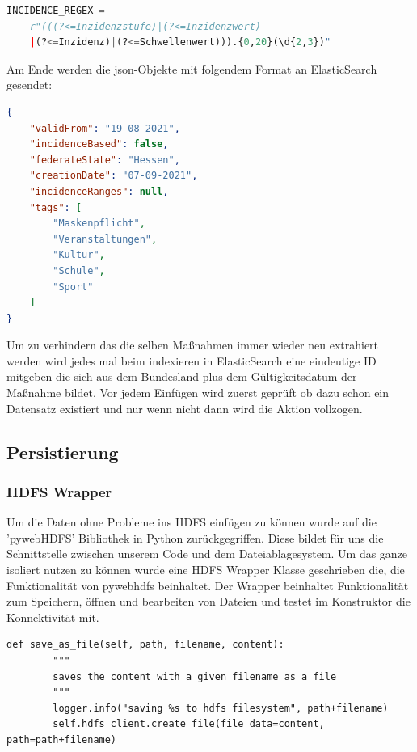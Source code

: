 \documentclass[12pt,oneside,a4paper,parskip]{scrbook}
\begin{document}
\begin{lstlisting}[caption=Regex für Inzidenzschranken, language=Python]
INCIDENCE_REGEX =
	r"(((?<=Inzidenzstufe)|(?<=Inzidenzwert)
	|(?<=Inzidenz)|(?<=Schwellenwert))).{0,20}(\d{2,3})"
\end{lstlisting}

Am Ende werden die json-Objekte mit folgendem Format an ElasticSearch gesendet:

\begin{lstlisting}[caption=Metadaten-Objekt, language=json]
{
	"validFrom": "19-08-2021",
	"incidenceBased": false,
	"federateState": "Hessen",
	"creationDate": "07-09-2021",
	"incidenceRanges": null,
	"tags": [
		"Maskenpflicht",
		"Veranstaltungen",
		"Kultur",
		"Schule",
		"Sport"
	]
}
\end{lstlisting}

Um zu verhindern das die selben Maßnahmen immer wieder neu extrahiert werden wird jedes mal beim indexieren in ElasticSearch eine eindeutige ID mitgeben die sich aus dem Bundesland plus dem Gültigkeitsdatum der Maßnahme bildet. Vor jedem Einfügen wird zuerst geprüft ob dazu schon ein Datensatz existiert und nur wenn nicht dann wird die Aktion vollzogen.

\subsection{Persistierung}

\subsubsection{HDFS Wrapper}

Um die Daten ohne Probleme ins HDFS einfügen zu können wurde auf die 'pywebHDFS' Bibliothek in Python zurückgegriffen. Diese bildet für uns die Schnittstelle zwischen unserem Code und dem Dateiablagesystem. Um das ganze isoliert nutzen zu können wurde eine HDFS Wrapper Klasse geschrieben die, die Funktionalität von pywebhdfs beinhaltet. Der Wrapper beinhaltet Funktionalität zum Speichern, öffnen und bearbeiten von Dateien und testet im Konstruktor die Konnektivität mit.

\begin{lstlisting}[caption=Datei-Speicherungs Funktion]
    def save_as_file(self, path, filename, content):
        """
        saves the content with a given filename as a file
        """
        logger.info("saving %s to hdfs filesystem", path+filename)
        self.hdfs_client.create_file(file_data=content, path=path+filename)
\end{lstlisting}
\end{document}
